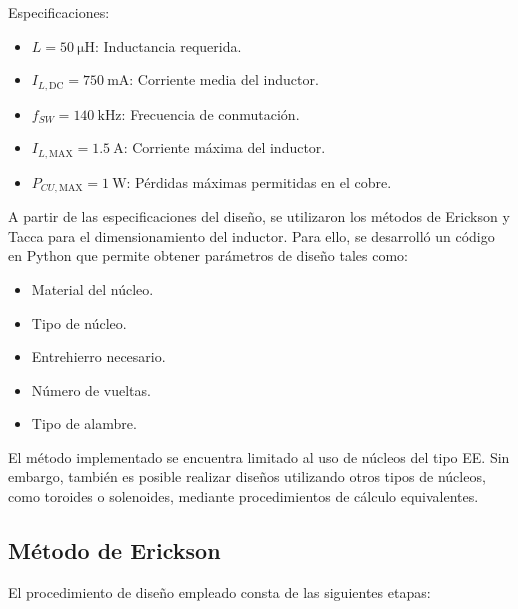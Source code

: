 \documentclass[]{article}
\begin{document}
Especificaciones:

\begin{itemize}
	\item $L = \SI{50}{\micro\henry}$: Inductancia requerida.
	\item $I_{L,\mathrm{DC}} = \SI{750}{\milli\ampere}$: Corriente media del inductor.
	\item $f_{SW} = \SI{140}{\kilo\hertz}$: Frecuencia de conmutación.
	\item $I_{L,\mathrm{MAX}} = \SI{1.5}{\ampere}$: Corriente máxima del inductor.
	\item $P_{CU,\mathrm{MAX}} = \SI{1}{\watt}$: Pérdidas máximas permitidas en el cobre.
\end{itemize}

A partir de las especificaciones del diseño, se utilizaron los métodos de Erickson y Tacca para el dimensionamiento del inductor. Para ello, se desarrolló un código en Python que permite obtener parámetros de diseño tales como:

\begin{itemize}
	\item Material del núcleo.
	\item Tipo de núcleo.
	\item Entrehierro necesario.
	\item Número de vueltas.
	\item Tipo de alambre.
\end{itemize}

El método implementado se encuentra limitado al uso de núcleos del tipo EE. Sin embargo, también es posible realizar diseños utilizando otros tipos de núcleos, como toroides o solenoides, mediante procedimientos de cálculo equivalentes.

\subsection*{Método de Erickson}

El procedimiento de diseño empleado consta de las siguientes etapas:
\end{document}
